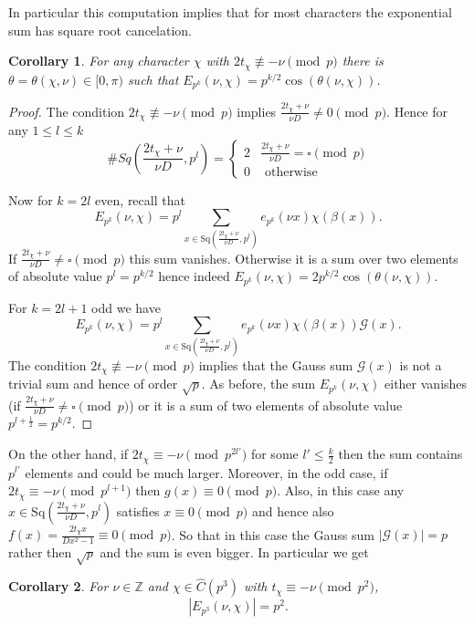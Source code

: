 \documentclass[12pt]{amsart}
\newtheorem{cor}{Corollary}
\theoremstyle{definition}
\theoremstyle{remark}
\numberwithin{equation}{section}
\newcommand{\calG}{\mathcal{G}}
\newcommand{\bbZ}{\mathbb{Z}}
\newcommand{\Sq}{\mathrm{Sq}}
\begin{document}
In particular this computation implies that for most characters the
exponential sum has square root cancelation.
\begin{cor}\label{c:bound}
For any character $\chi$ with $2t_\chi\not\equiv -\nu \pmod p$ there
is $\theta=\theta(\chi,\nu)\in[0,\pi)$ such that
$E_{p^k}(\nu,\chi)=p^{k/2}\cos(\theta(\nu,\chi))$.
\end{cor}
\begin{proof}
The condition $2t_\chi\not\equiv -\nu \pmod p$ implies
$\frac{2t_\chi+\nu}{\nu D}\neq 0\pmod{p}$. Hence for any $1\leq
l\leq k$
\[\#Sq(\frac{2t_\chi+\nu}{\nu D},p^l)=\left\lbrace\begin{array}{cc}
2 &\frac{2t_\chi+\nu}{\nu D}= \square\pmod{p}\\
0 & \mbox{ otherwise}\end{array}\right.\]

Now for $k=2l$ even, recall that
\[E_{p^k}(\nu,\chi)=p^{l}\sum_{x\in\Sq(\frac{2t_\chi+\nu}{\nu D},p^l)}e_{p^k}(\nu x)\chi(\beta(x)).\]
If $\frac{2t_\chi+\nu}{\nu D}\neq \square\pmod{p}$ this sum
vanishes. Otherwise it is a sum over two elements of absolute value
$p^l=p^{k/2}$ hence indeed $E_{p^k}(\nu,\chi)=
2p^{k/2}\cos(\theta(\nu,\chi))$.

For $k=2l+1$ odd we have
\[E_{p^k}(\nu,\chi)=p^{l}\sum_{x\in \Sq(\frac{2t_\chi+\nu}{\nu D},p^l)}e_{p^k}(\nu x)\chi(\beta(x))\calG(x).\]
The condition $2t_\chi\not\equiv -\nu \pmod p$ implies that the
Gauss sum $\calG(x)$ is not a trivial sum and hence of order
$\sqrt{p}$. As before, the sum $E_{p^k}(\nu,\chi)$ either vanishes
(if $\frac{2t_\chi+\nu}{\nu D}\neq \square\pmod{p}$) or it is a sum
of two elements of absolute value $p^{l+\frac{1}{2}}=p^{k/2}$.
\end{proof}

On the other hand, if $2t_\chi\equiv -\nu \pmod{p^{2l'}}$ for some
$l'\leq \frac{k}{2}$ then the sum contains $p^{l'}$ elements and
could be much larger. Moreover, in the odd case, if $2t_\chi\equiv
-\nu\pmod{p^{l+1}}$ then $g(x)\equiv 0\pmod{p}$. Also, in this case
any $x\in\Sq(\frac{2t_\chi+\nu}{\nu D},p^l)$ satisfies $x\equiv
0\pmod{p}$ and hence also $f(x)=\frac{2t_\chi x}{Dx^2-1}\equiv
0\pmod{p}$. So that in this case the Gauss sum $|\calG(x)|=p$ rather
then $\sqrt{p}$ and the sum is even bigger. In particular we get
\begin{cor}\label{c:big}
For $\nu\in\bbZ$ and $\chi\in\hat C(p^3)$ with $t_\chi\equiv
-\nu\pmod{p^2}$,
\[|E_{p^3}(\nu,\chi)|=p^2.\]
\end{cor}
\end{document}
